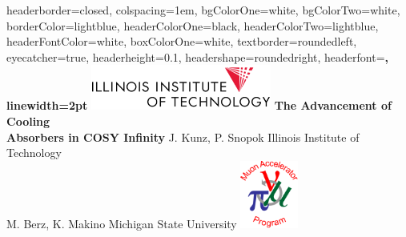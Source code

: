 \documentclass[landscape,a0paper,fontscale=0.285]{baposter} %
\begin{document}
\begin{poster}
{
headerborder=closed, %
colspacing=1em, %
bgColorOne=white, %
bgColorTwo=white, %
borderColor=lightblue, %
headerColorOne=black, %
headerColorTwo=lightblue, %
headerFontColor=white, %
boxColorOne=white, %
textborder=roundedleft, %
eyecatcher=true, %
headerheight=0.1\textheight, %
headershape=roundedright, %
headerfont=\Large\bf\textsc, %
linewidth=2pt %
}
%
{\includegraphics[height=4em]{IITlogo.png}} %
{\bf\huge{\hspace{-1.5in}The Advancement of Cooling \\ \hspace{-1.5in}Absorbers in COSY Infinity}\vspace{0.1em}} %
{{ \large{\hspace{-1.5in}J. Kunz, P. Snopok \hspace{12pt} Illinois Institute of Technology \\\hspace{-1.5in}M. Berz, K. Makino \hspace{12pt}Michigan State University \vspace{-0.4em}}}}
{\includegraphics[height=6em]{MAPlogo.png}} %


\end{poster}
\end{document}

